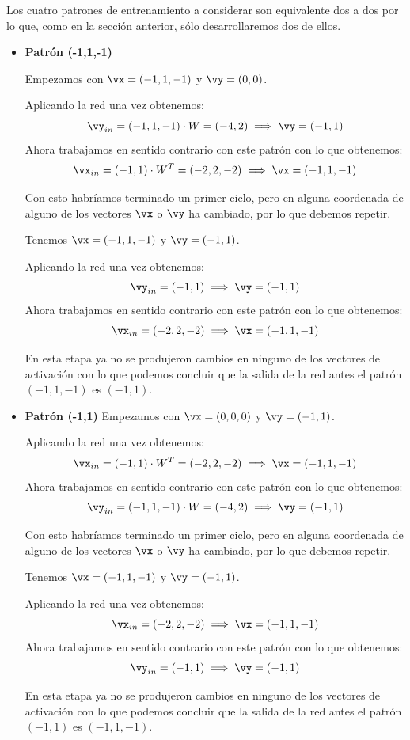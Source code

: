 \begin{problem}[10]
Los cuatro patrones de entrenamiento a considerar son equivalente dos a dos por lo que, como en la sección anterior, sólo desarrollaremos dos de ellos.

\begin{itemize}
\item \textbf{Patrón (-1,1,-1)}

Empezamos con $\vx=(-1,1,-1)$ y $\vy = (0,0)$.

Aplicando la red una vez obtenemos:
\[\vy_{in} = (-1,1,-1)\cdot W = (-4,2) \implies \vy = (-1,1)\]
Ahora trabajamos en sentido contrario con este patrón con lo que obtenemos:
\[\vx_{in} = (-1,1)\cdot W^T = (-2,2,-2) \implies \vx = (-1,1,-1)\]

Con esto habríamos terminado un primer ciclo, pero en alguna coordenada de alguno de los vectores $\vx$ o $\vy$ ha cambiado, por lo que debemos repetir.

Tenemos $\vx=(-1,1,-1)$ y $\vy = (-1,1)$.

Aplicando la red una vez obtenemos:
\[\vy_{in} = (-1,1) \implies \vy = (-1,1)\]
Ahora trabajamos en sentido contrario con este patrón con lo que obtenemos:
\[\vx_{in} = (-2,2,-2) \implies \vx = (-1,1,-1)\]

En esta etapa ya no se produjeron cambios en ninguno de los vectores de activación con lo que podemos concluir que la salida de la red antes el patrón $(-1,1,-1)$ es $(-1,1)$.

\item \textbf{Patrón (-1,1)}
Empezamos con $\vx=(0,0,0)$ y $\vy = (-1,1)$.

Aplicando la red una vez obtenemos:
\[\vx_{in} = (-1,1)\cdot W^T = (-2,2,-2) \implies \vx = (-1,1,-1)\]
Ahora trabajamos en sentido contrario con este patrón con lo que obtenemos:
\[\vy_{in} = (-1,1,-1)\cdot W = (-4,2) \implies \vy = (-1,1)\]

Con esto habríamos terminado un primer ciclo, pero en alguna coordenada de alguno de los vectores $\vx$ o $\vy$ ha cambiado, por lo que debemos repetir.

Tenemos $\vx=(-1,1,-1)$ y $\vy = (-1,1)$.

Aplicando la red una vez obtenemos:
\[\vx_{in} = (-2,2,-2) \implies \vx = (-1,1,-1)\]
Ahora trabajamos en sentido contrario con este patrón con lo que obtenemos:
\[\vy_{in} = (-1,1) \implies \vy = (-1,1)\]

En esta etapa ya no se produjeron cambios en ninguno de los vectores de activación con lo que podemos concluir que la salida de la red antes el patrón $(-1,1)$ es $(-1,1,-1)$.


\end{itemize}
\end{problem}
